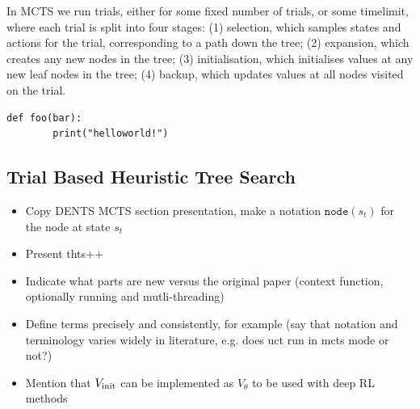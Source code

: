 
    In MCTS we run trials, either for some fixed number of trials, or some timelimit, where each trial is split into four stages: 
        (1) selection, which samples states and actions for the trial, corresponding to a path down the tree;
        (2) expansion, which creates any new nodes in the tree; 
        (3) initialisation, which initialises values at any new leaf nodes in the tree;
        (4) backup, which updates values at all nodes visited on the trial.


    \begin{lstlisting}
def foo(bar):
        print("helloworld!")
    \end{lstlisting}

    \subsection{Trial Based Heuristic Tree Search}
    \label{sec:2-3-1-thts}
    
        \begin{itemize}
            \item{Copy DENTS MCTS section presentation, make a notation } $\texttt{node}(s_t)$ for the node at state $s_t$
            \item Present thts++
            \item Indicate what parts are new versus the original paper (context function, optionally running \mctsmode\ewe and mutli-threading)
            \item Define terms precisely and consistently, for example \mctsmode\ewe (say that notation and terminology varies widely in literature, e.g. does uct run in mcts mode or not?)
            \item Mention that ${V_{\textnormal{init}}}$ can be implemented as $V_\theta$ to be used with deep RL methods
        \end{itemize}

